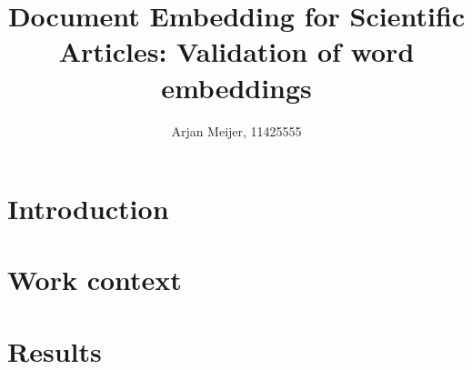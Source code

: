 \documentclass[10pt,a4paper]{article}
\begin{document}
\begin{titlepage}
\title{Document Embedding for Scientific Articles: Validation of word embeddings}
\author{Arjan Meijer, 11425555}
\clearpage\maketitle\thispagestyle{empty}

\end{titlepage}

\section{Introduction}

\clearpage

\clearpage

\clearpage
\section{Work context}


\section{Results}



\clearpage




\end{document}
